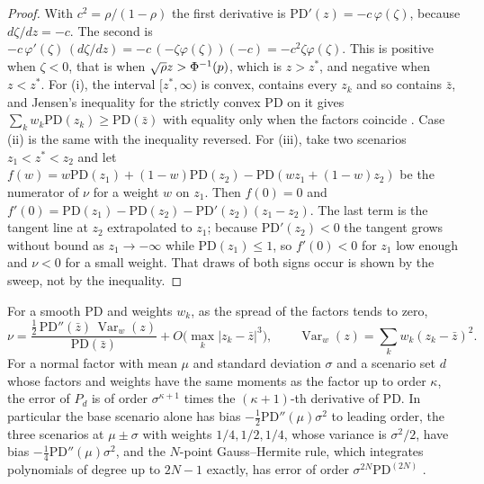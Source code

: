 \begin{proof}
With $c^{2}=\rho/(1-\rho)$ the first derivative is $\mathrm{PD}'(z)=-c\,\varphi(\zeta)$, because $d\zeta/dz=-c$. The second is $-c\,\varphi'(\zeta)\,(d\zeta/dz)=-c\,(-\zeta\varphi(\zeta))(-c)=-c^{2}\zeta\varphi(\zeta)$. This is positive when $\zeta<0$, that is when $\sqrt\rho z>\Phi^{-1}(p)$, which is $z>z^{*}$, and negative when $z<z^{*}$. For (i), the interval $[z^{*},\infty)$ is convex, contains every $z_k$ and so contains $\bar z$, and Jensen's inequality for the strictly convex $\mathrm{PD}$ on it gives $\sum_kw_k\mathrm{PD}(z_k)\ge\mathrm{PD}(\bar z)$ with equality only when the factors coincide \citep{jensen1906}. Case (ii) is the same with the inequality reversed. For (iii), take two scenarios $z_1<z^{*}<z_2$ and let $f(w)=w\mathrm{PD}(z_1)+(1-w)\mathrm{PD}(z_2)-\mathrm{PD}(wz_1+(1-w)z_2)$ be the numerator of $\nu$ for a weight $w$ on $z_1$. Then $f(0)=0$ and $f'(0)=\mathrm{PD}(z_1)-\mathrm{PD}(z_2)-\mathrm{PD}'(z_2)(z_1-z_2)$. The last term is the tangent line at $z_2$ extrapolated to $z_1$; because $\mathrm{PD}'(z_2)<0$ the tangent grows without bound as $z_1\to-\infty$ while $\mathrm{PD}(z_1)\le1$, so $f'(0)<0$ for $z_1$ low enough and $\nu<0$ for a small weight. That draws of both signs occur is shown by the sweep, not by the inequality.
\end{proof}

\begin{proposition}
\label{prop:bias}
For a smooth $\mathrm{PD}$ and weights $w_k$, as the spread of the factors tends to zero,
\begin{equation}
\nu=\frac{\tfrac12\,\mathrm{PD}''(\bar z)\,\operatorname{Var}_w(z)}{\mathrm{PD}(\bar z)}+O\big(\max_k|z_k-\bar z|^{3}\big),\qquad \operatorname{Var}_w(z)=\sum_kw_k(z_k-\bar z)^{2}.
\label{eq:second-order}
\end{equation}
For a normal factor with mean $\mu$ and standard deviation $\sigma$ and a scenario set $d$ whose factors and weights have the same moments as the factor up to order $\kappa$, the error of $P_d$ is of order $\sigma^{\kappa+1}$ times the $(\kappa+1)$-th derivative of $\mathrm{PD}$. In particular the base scenario alone has bias $-\tfrac12\mathrm{PD}''(\mu)\sigma^{2}$ to leading order, the three scenarios at $\mu\pm\sigma$ with weights $1/4,1/2,1/4$, whose variance is $\sigma^{2}/2$, have bias $-\tfrac14\mathrm{PD}''(\mu)\sigma^{2}$, and the $N$-point Gauss--Hermite rule, which integrates polynomials of degree up to $2N-1$ exactly, has error of order $\sigma^{2N}\mathrm{PD}^{(2N)}$ \citep{golubwelsch1969}.
\end{proposition}

